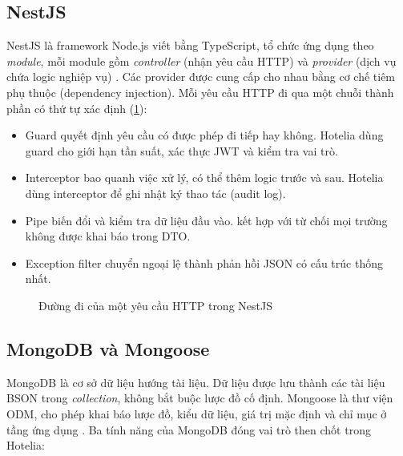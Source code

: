 \subsection{NestJS}

NestJS là framework Node.js viết bằng TypeScript, tổ chức ứng dụng theo \emph{module}, mỗi module gồm \emph{controller} (nhận yêu cầu HTTP) và \emph{provider} (dịch vụ chứa logic nghiệp vụ) \cite{nestjs}. Các provider được cung cấp cho nhau bằng cơ chế tiêm phụ thuộc (dependency injection). Mỗi yêu cầu HTTP đi qua một chuỗi thành phần có thứ tự xác định (\cref{fig:nest-pipeline}):

\begin{itemize}
\item Guard quyết định yêu cầu có được phép đi tiếp hay không. Hotelia dùng guard cho giới hạn tần suất, xác thực JWT và kiểm tra vai trò.
\item Interceptor bao quanh việc xử lý, có thể thêm logic trước và sau. Hotelia dùng interceptor để ghi nhật ký thao tác (audit log).
\item Pipe biến đổi và kiểm tra dữ liệu đầu vào.  kết hợp với  từ chối mọi trường không được khai báo trong DTO.
\item Exception filter chuyển ngoại lệ thành phản hồi JSON có cấu trúc thống nhất.
\end{itemize}

\begin{figure}[H]
\centering
{}
\caption{Đường đi của một yêu cầu HTTP trong NestJS}\label{fig:nest-pipeline}
\end{figure}

\subsection{MongoDB và Mongoose}

MongoDB là cơ sở dữ liệu hướng tài liệu. Dữ liệu được lưu thành các tài liệu BSON trong \emph{collection}, không bắt buộc lược đồ cố định. Mongoose là thư viện ODM, cho phép khai báo lược đồ, kiểu dữ liệu, giá trị mặc định và chỉ mục ở tầng ứng dụng \cite{mongoose}. Ba tính năng của MongoDB đóng vai trò then chốt trong Hotelia:

